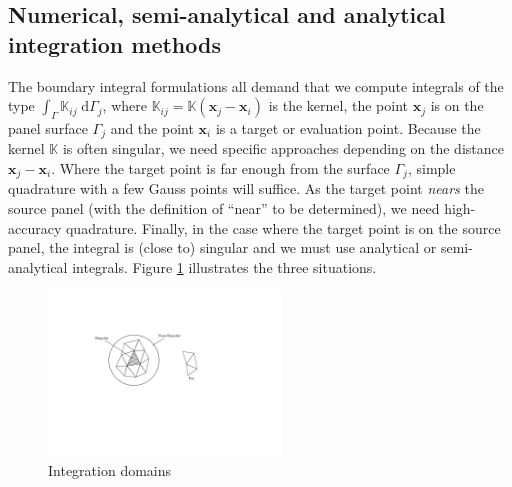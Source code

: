 \documentclass[final,leqno,]{siamltex1213}
\newcommand{\K}{\mathbb{K}}
\newcommand{\di}[1]{\text{d}#1}
\newcommand{\vect}[1]{\mathbf{#1}}
\begin{document}
\subsection{Numerical, semi-analytical and analytical integration methods}

The boundary integral formulations all demand that we compute integrals of the type $\int_{\Gamma} \K_{ij}\;\di{\Gamma_j}$, where $\K_{ij}=\K(\vect{x}_j-\vect{x}_i)$ is the kernel, the point $\vect{x}_j$ is on the panel surface $\Gamma_j$ and the point $\vect{x}_i$ is a target or evaluation point. Because the kernel $\K$ is often singular, we need specific approaches depending on the distance $\vect{x}_j-\vect{x}_i$. Where the target point is far enough from the surface $\Gamma_j$, simple quadrature with a few Gauss points will suffice. As the target point \emph{nears} the source panel (with the definition of ``near'' to be determined), we need high-accuracy quadrature. Finally, in the case where the target point is on the source panel, the integral is (close to) singular and we must use analytical or semi-analytical integrals. Figure \ref{fig:integration_domain} illustrates the three situations.

\begin{figure}[t]
	\begin{centering}
\includegraphics[natwidth=5.15in,natheight=2.6in,width=0.55\textwidth]{IntegrationDomain.pdf}
	\caption{Integration domains}
	\label{fig:integration_domain}
	\end{centering}
\end{figure}
\end{document}
